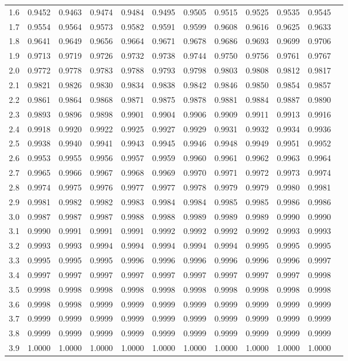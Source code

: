 \documentclass[pdftex,11pt,openany]{book}\usepackage[]{graphicx}\usepackage[]{color}
\begin{document}
{\begin{center}
\begin{tabular}{rr@{\ }r@{\ }r@{\ }r@{\ }r@{\ }r@{\ }r@{\ }r@{\ }r@{\ }r@{\ }r}
1.6&0.9452&0.9463&0.9474&0.9484&0.9495&0.9505&0.9515&0.9525&0.9535&0.9545\\
1.7&0.9554&0.9564&0.9573&0.9582&0.9591&0.9599&0.9608&0.9616&0.9625&0.9633\\
1.8&0.9641&0.9649&0.9656&0.9664&0.9671&0.9678&0.9686&0.9693&0.9699&0.9706\\
1.9&0.9713&0.9719&0.9726&0.9732&0.9738&0.9744&0.9750&0.9756&0.9761&0.9767\\
2.0&0.9772&0.9778&0.9783&0.9788&0.9793&0.9798&0.9803&0.9808&0.9812&0.9817\\
2.1&0.9821&0.9826&0.9830&0.9834&0.9838&0.9842&0.9846&0.9850&0.9854&0.9857\\
2.2&0.9861&0.9864&0.9868&0.9871&0.9875&0.9878&0.9881&0.9884&0.9887&0.9890\\
2.3&0.9893&0.9896&0.9898&0.9901&0.9904&0.9906&0.9909&0.9911&0.9913&0.9916\\
2.4&0.9918&0.9920&0.9922&0.9925&0.9927&0.9929&0.9931&0.9932&0.9934&0.9936\\
2.5&0.9938&0.9940&0.9941&0.9943&0.9945&0.9946&0.9948&0.9949&0.9951&0.9952\\
2.6&0.9953&0.9955&0.9956&0.9957&0.9959&0.9960&0.9961&0.9962&0.9963&0.9964\\
2.7&0.9965&0.9966&0.9967&0.9968&0.9969&0.9970&0.9971&0.9972&0.9973&0.9974\\
2.8&0.9974&0.9975&0.9976&0.9977&0.9977&0.9978&0.9979&0.9979&0.9980&0.9981\\
2.9&0.9981&0.9982&0.9982&0.9983&0.9984&0.9984&0.9985&0.9985&0.9986&0.9986\\
3.0&0.9987&0.9987&0.9987&0.9988&0.9988&0.9989&0.9989&0.9989&0.9990&0.9990\\
3.1&0.9990&0.9991&0.9991&0.9991&0.9992&0.9992&0.9992&0.9992&0.9993&0.9993\\
3.2&0.9993&0.9993&0.9994&0.9994&0.9994&0.9994&0.9994&0.9995&0.9995&0.9995\\
3.3&0.9995&0.9995&0.9995&0.9996&0.9996&0.9996&0.9996&0.9996&0.9996&0.9997\\
3.4&0.9997&0.9997&0.9997&0.9997&0.9997&0.9997&0.9997&0.9997&0.9997&0.9998\\
3.5&0.9998&0.9998&0.9998&0.9998&0.9998&0.9998&0.9998&0.9998&0.9998&0.9998\\
3.6&0.9998&0.9998&0.9999&0.9999&0.9999&0.9999&0.9999&0.9999&0.9999&0.9999\\
3.7&0.9999&0.9999&0.9999&0.9999&0.9999&0.9999&0.9999&0.9999&0.9999&0.9999\\
3.8&0.9999&0.9999&0.9999&0.9999&0.9999&0.9999&0.9999&0.9999&0.9999&0.9999\\
3.9&1.0000&1.0000&1.0000&1.0000&1.0000&1.0000&1.0000&1.0000&1.0000&1.0000\\


\end{tabular}
\end{center}}
\end{document}
